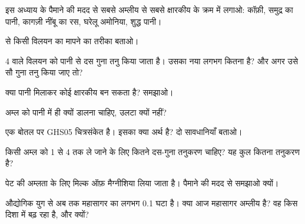 \begin{exercise}[$\star$]\label{exo:g9:acids-bases-ph:3}
इस अध्याय के  पैमाने की मदद से सबसे अम्लीय से सबसे क्षारकीय के क्रम में
लगाओ: कॉफ़ी, समुद्र का पानी, कागज़ी नींबू का रस, घरेलू अमोनिया, शुद्ध
पानी।
\end{exercise}

\begin{exercise}[$\star$]\label{exo:g9:acids-bases-ph:4}
 से किसी विलयन का  मापने का तरीका बताओ।
\end{exercise}

\begin{exercise}[$\star\star$]\label{exo:g9:acids-bases-ph:5}
 4 वाले विलयन को पानी से दस गुना तनु किया जाता है। उसका नया  लगभग कितना
है? और अगर उसे सौ गुना तनु किया जाए तो?
\end{exercise}

\begin{exercise}[$\star\star$]\label{exo:g9:acids-bases-ph:6}
क्या पानी मिलाकर कोई  क्षारकीय बन सकता है? समझाओ।
\end{exercise}

\begin{exercise}[$\star\star$]\label{exo:g9:acids-bases-ph:7}
अम्ल को पानी में ही क्यों डालना चाहिए, उलटा क्यों नहीं?
\end{exercise}

\begin{exercise}[$\star\star$]\label{exo:g9:acids-bases-ph:8}
एक बोतल पर GHS05 चित्रसंकेत है। इसका क्या अर्थ है? दो
सावधानियाँ बताओ।
\end{exercise}

\begin{exercise}[$\star\star$]\label{exo:g9:acids-bases-ph:9}
किसी अम्ल को  1 से  4 तक ले जाने के लिए कितने दस-गुना तनुकरण चाहिए?
यह कुल कितना तनुकरण है?
\end{exercise}

\begin{exercise}[$\star\star$]\label{exo:g9:acids-bases-ph:10}
पेट की अम्लता के लिए मिल्क ऑफ़ मैग्नीशिया लिया जाता है।  पैमाने की मदद से
समझाओ क्यों।
\end{exercise}

\begin{exercise}[$\star\star\star$]\label{exo:g9:acids-bases-ph:11}
औद्योगिक युग से अब तक महासागर का  लगभग 0.1 घटा है। क्या आज महासागर
अम्लीय है? वह किस दिशा में बढ़ रहा है, और क्यों?
\end{exercise}

